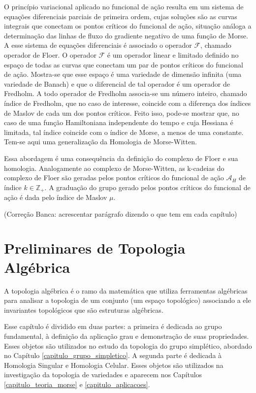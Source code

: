 \documentclass[12pt]{book}
\newcommand{\funcionalH}{\mathcal{A}_{H}}
\newcommand{\inteiros}{\mathbb{Z}}
\newcommand{\operadorFloer}{\mathcal{F}}
\newcommand{\alerta}[1]{{\color{red}#1}}
\newcommand{\correcaobanca}[1]{\alerta{(Correção Banca: #1)}}
\begin{document}
	O princípio variacional aplicado no funcional de ação resulta em um sistema de equações diferenciais parciais de primeira ordem, cujas soluções são as curvas integrais que conectam os pontos críticos do funcional de ação, situação análoga a determinação das linhas de fluxo do gradiente negativo de uma função de Morse. A esse sistema de equações diferenciais é associado o operador $\operadorFloer$, chamado operador de Floer. O operador $\operadorFloer$ é um operador linear e limitado 
	definido no espaço de todas as curvas que conectam um par de pontos críticos do funcional de ação. Mostra-se que esse espaço é uma variedade de dimensão infinita (uma variedade de Banach) e que o diferencial de tal operador é um operador de Fredholm. A todo operador de Fredholm associa-se um número inteiro, chamado índice de Fredholm, que no caso de interesse, coincide com a diferença dos índices de Maslov de cada um dos pontos críticos. Feito isso, pode-se mostrar que, no caso de uma função Hamiltoniana independente do tempo e cuja Hessiana é limitada, tal índice coincide com o índice de Morse, a menos de uma constante. Tem-se aqui uma generalização da Homologia de Morse-Witten.
	
	Essa abordagem é uma consequência da definição do complexo de Floer e sua homologia. Analogamente ao complexo de Morse-Witten, as k-cadeias do complexo de Floer são geradas pelos pontos críticos do funcional de ação $\funcionalH$ de índice $k \in \inteiros_{+}$. A graduação do grupo gerado pelos pontos críticos do funcional de ação é dada pelo índice de Maslov $\mu$.
	
	\correcaobanca{acrescentar parágrafo dizendo o que tem em cada capítulo}
	
	\chapter{Preliminares de Topologia Algébrica}
	A topologia algébrica é o ramo da matemática que utiliza ferramentas algébricas para analisar a topologia de um conjunto (um espaço topológico) associando a ele invariantes topológicos que são estruturas algébricas.
	
	Esse capítulo é dividido em duas partes: a primeira é dedicada ao grupo fundamental, à definição da aplicação grau e demonstração de suas propriedades. Esses objetos são utilizados no estudo da topologia do grupo simplético, abordado no Capítulo \ref{capitulo_grupo_simpletico}. A segunda parte é dedicada à Homologia Singular e Homologia Celular. Esses objetos são utilizados na investigação da topologia de variedades e aparecem nos Capítulos \ref{capitulo_teoria_morse} e \ref{capitulo_aplicacoes}.
	
\end{document}
